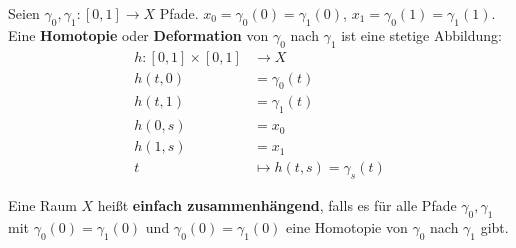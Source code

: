 \documentclass[main.tex]{subfiles}
\begin{document}
\begin{Definition}[Homotopie]
  Seien $\gamma_0, \gamma_1 : [0,1] \to X$ Pfade. $x_0 = \gamma_0(0) = \gamma_1(0)$, $x_1 = \gamma_0(1) = \gamma_1(1)$. Eine \textbf{Homotopie} oder \textbf{Deformation} von $\gamma_0$ nach $\gamma_1$ ist eine stetige Abbildung:
  $$\begin{aligned}
    h: [0,1] \times [0,1] & \to X \\
    h(t,0) & = \gamma_0(t) \\
    h(t,1) & = \gamma_1(t) \\
    h(0,s) & = x_0 \\
    h(1,s) & = x_1 \\
    t & \mapsto h(t,s) = \gamma_s(t)
  \end{aligned}$$
\end{Definition}

\begin{Definition}
  Eine Raum $X$ heißt \textbf{einfach zusammenhängend}, falls es für alle Pfade $\gamma_0, \gamma_1$ mit $\gamma_0(0) = \gamma_1(0)$ und $\gamma_0(0) = \gamma_1(0)$ eine Homotopie von $\gamma_0$ nach $\gamma_1$ gibt.
\end{Definition}
\end{document}
